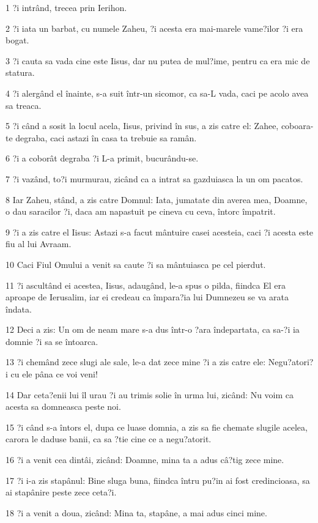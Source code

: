 \par 1 ?i intrând, trecea prin Ierihon.
\par 2 ?i iata un barbat, cu numele Zaheu, ?i acesta era mai-marele vame?ilor ?i era bogat.
\par 3 ?i cauta sa vada cine este Iisus, dar nu putea de mul?ime, pentru ca era mic de statura.
\par 4 ?i alergând el înainte, s-a suit într-un sicomor, ca sa-L vada, caci pe acolo avea sa treaca.
\par 5 ?i când a sosit la locul acela, Iisus, privind în sus, a zis catre el: Zahee, coboara-te degraba, caci astazi în casa ta trebuie sa ramân.
\par 6 ?i a coborât degraba ?i L-a primit, bucurându-se.
\par 7 ?i vazând, to?i murmurau, zicând ca a intrat sa gazduiasca la un om pacatos.
\par 8 Iar Zaheu, stând, a zis catre Domnul: Iata, jumatate din averea mea, Doamne, o dau saracilor ?i, daca am napastuit pe cineva cu ceva, întorc împatrit.
\par 9 ?i a zis catre el Iisus: Astazi s-a facut mântuire casei acesteia, caci ?i acesta este fiu al lui Avraam.
\par 10 Caci Fiul Omului a venit sa caute ?i sa mântuiasca pe cel pierdut.
\par 11 ?i ascultând ei acestea, Iisus, adaugând, le-a spus o pilda, fiindca El era aproape de Ierusalim, iar ei credeau ca împara?ia lui Dumnezeu se va arata îndata.
\par 12 Deci a zis: Un om de neam mare s-a dus într-o ?ara îndepartata, ca sa-?i ia domnie ?i sa se întoarca.
\par 13 ?i chemând zece slugi ale sale, le-a dat zece mine ?i a zis catre ele: Negu?atori?i cu ele pâna ce voi veni!
\par 14 Dar ceta?enii lui îl urau ?i au trimis solie în urma lui, zicând: Nu voim ca acesta sa domneasca peste noi.
\par 15 ?i când s-a întors el, dupa ce luase domnia, a zis sa fie chemate slugile acelea, carora le daduse banii, ca sa ?tie cine ce a negu?atorit.
\par 16 ?i a venit cea dintâi, zicând: Doamne, mina ta a adus câ?tig zece mine.
\par 17 ?i i-a zis stapânul: Bine sluga buna, fiindca întru pu?in ai fost credincioasa, sa ai stapânire peste zece ceta?i.
\par 18 ?i a venit a doua, zicând: Mina ta, stapâne, a mai adus cinci mine.
